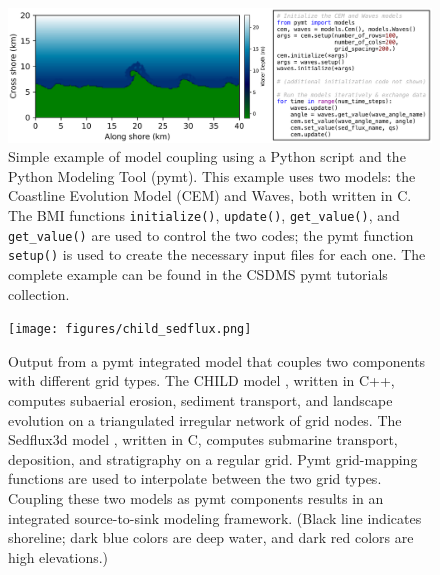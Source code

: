 \documentclass[10pt,twocolumn,preprint]{elsarticle}
\begin{document}
\begin{figure}[htbp]
   \centering
   \includegraphics[width=\textwidth]{figures/pymt_cem+waves_example.pdf} %
   \caption{Simple example of model coupling using a Python script and the Python Modeling Tool (pymt). This example uses two models: the Coastline Evolution Model (CEM) and Waves, both written in C. The BMI functions \texttt{initialize()}, \texttt{update()}, \texttt{get\_value()}, and \texttt{get\_value()} are used to control the two codes; the pymt function \texttt{setup()} is used to create the necessary input files for each one. The complete example can be found in the CSDMS pymt tutorials collection.}
   \label{fig:pymt-cem-waves-example}
\end{figure}

\begin{figure}[htbp]
   \centering
   \texttt{[image: figures/child\_sedflux.png]} 
   \caption{Output from a pymt integrated model that couples two components with different grid types. The CHILD model \citep{tucker2001channel}, written in C++, computes subaerial erosion, sediment transport, and landscape evolution on a triangulated irregular network of grid nodes. The Sedflux3d model \citep{hutton2008sedflux}, written in C, computes submarine transport, deposition, and stratigraphy on a regular grid. Pymt grid-mapping functions are used to interpolate between the two grid types. Coupling these two models as pymt components results in an integrated source-to-sink modeling framework. (Black line indicates shoreline; dark blue colors are deep water, and dark red colors are high elevations.)}
   \label{fig:child-sedflux}
\end{figure}
\end{document}
